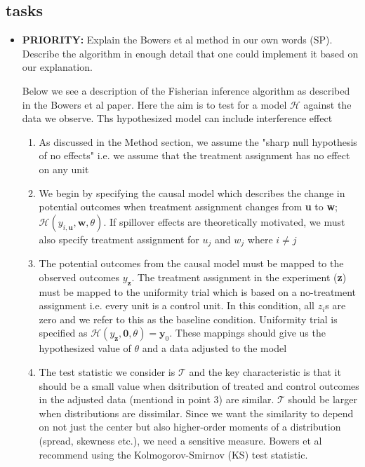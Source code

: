 \documentclass[12pt]{article}
\begin{document}
\subsection{tasks}
\begin{itemize}
\item {\bf PRIORITY:} Explain the Bowers et al method in our own words (SP). Describe the algorithm in enough detail that one could implement it based on our explanation.

Below we see a description of the Fisherian inference algorithm as described in the Bowers et al paper. Here the aim is to test for a model $\mathcal{H}$ against the data we observe. Ths hypothesized model can include interference effect

\begin{enumerate}

\item As discussed in the Method section, we assume the "sharp null hypothesis of no effects" i.e. we assume that the treatment assignment has no effect on any unit

\item We begin by specifying the causal model which describes the change in potential outcomes when treatment assignment changes from \textbf{u} to \textbf{w}; $\mathcal{H}(y_{i, \textbf{u}}, \textbf{w}, \theta)$. If spillover effects are theoretically motivated, we must also specify treatment assignment for $u_j$ and $w_j$ where $i \neq j$

\item The potential outcomes from the causal model must be mapped to the observed outcomes $y_\textbf{z}$. The treatment assignment in the experiment (\textbf{z}) must be mapped to the uniformity trial which is based on a no-treatment assignment i.e. every unit is a control unit. In this condition, all $z_{i}$s are zero and we refer to this as the baseline condition. Uniformity trial is specified as $\mathcal{H}(y_{\textbf{z}}, \textbf{0}, \theta) = \textbf{y}_0$. These mappings should give us the hypothesized value of $\theta$ and a data adjusted to the model

\item The test statistic we consider is $\mathcal{T}$ and the key characteristic is that it should be a small value when dsitribution of treated and control outcomes in the adjusted data (mentiond in point 3) are similar. $\mathcal{T}$ should be larger when distributions are dissimilar. Since we want the similarity to depend on not just the center but also higher-order moments of a distribution (spread, skewness etc.), we need a sensitive measure. Bowers et al recommend using the Kolmogorov-Smirnov (KS) test statistic.


\end{enumerate}
\end{itemize}
\end{document}
